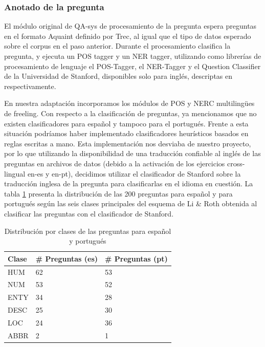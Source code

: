\subsubsection{Anotado de la pregunta}

El módulo original de QA-sys de procesamiento de la pregunta espera preguntas en el formato Aquaint definido por Trec, al igual que el tipo de datos esperado sobre el corpus en el paso anterior. Durante el procesamiento clasifica la pregunta, y ejecuta un POS tagger y un NER tagger, utilizando como librerías de procesamiento de lenguaje el POS-Tagger, el NER-Tagger y el Question Classifier de la Universidad de Stanford, disponibles solo para inglés, descriptas en  respectivamente.

En nuestra adaptación incorporamos los módulos de POS y NERC multilingües de freeling. Con respecto a la clasificación de preguntas, ya mencionamos que no existen clasificadores para español y tampoco para el portugués. Frente a esta situación podríamos haber implementado clasificadores heurísticos basados en reglas escritas a mano. Esta implementación nos desviaba de nuestro proyecto, por lo que utilizando la disponibilidad de una traducción confiable al inglés de las preguntas en archivos de datos (debido a la activación de los ejercicios cross-lingual en-es y en-pt), decidimos utilizar el clasificador de Stanford sobre la traducción inglesa de la pregunta para clasificarlas en el idioma en cuestión.
La tabla \ref{table:qc-es-pt} presenta la distribución de las 200 preguntas para español y para portugués según las seis clases principales del esquema de Li \& Roth obtenida al clasificar las preguntas con el clasificador de Stanford.

\begin{table}
\centering
\begin{center}
\begin{tabular}{| l | l | l | }
\hline
Clase & \# Preguntas (es)  & \# Preguntas (pt)\\ \hline
HUM &  62 & 53 \\ \hline
NUM &  53 & 52\\ \hline
ENTY &  34 & 28\\ \hline
DESC &  25 & 30\\ \hline
LOC &  24 & 36\\ \hline
ABBR &  2 & 1\\ \hline
\end{tabular}
\caption{Distribución por clases de las preguntas para español y portugués}
\label{table:qc-es-pt}
\end{center}
\end{table}



